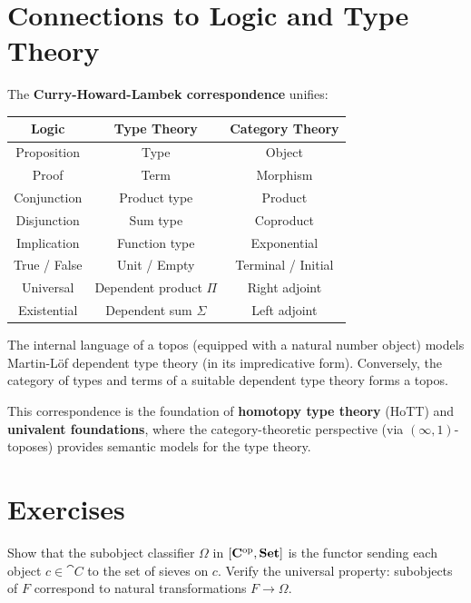 \section{Connections to Logic and Type Theory}

The \textbf{Curry-Howard-Lambek correspondence} unifies:
\begin{center}
\begin{tabular}{ccc}
\toprule
Logic & Type Theory & Category Theory \\
\midrule
Proposition & Type & Object \\
Proof & Term & Morphism \\
Conjunction & Product type & Product \\
Disjunction & Sum type & Coproduct \\
Implication & Function type & Exponential \\
True / False & Unit / Empty & Terminal / Initial \\
Universal & Dependent product $\Pi$ & Right adjoint \\
Existential & Dependent sum $\Sigma$ & Left adjoint \\
\bottomrule
\end{tabular}
\end{center}

\begin{theorem}
The internal language of a topos (equipped with a natural number object) models Martin-Löf dependent type theory (in its impredicative form). Conversely, the category of types and terms of a suitable dependent type theory forms a topos.
\end{theorem}

This correspondence is the foundation of \textbf{homotopy type theory} (HoTT) and \textbf{univalent foundations}, where the category-theoretic perspective (via $(\infty,1)$-toposes) provides semantic models for the type theory.

\section{Exercises}

\begin{exercise}
Show that the subobject classifier $\Omega$ in $[\mathbf{C}^{\mathrm{op}}, \mathbf{Set}]$ is the functor sending each object $c \in \cat{C}$ to the set of sieves on $c$. Verify the universal property: subobjects of $F$ correspond to natural transformations $F \to \Omega$.
\end{exercise}

